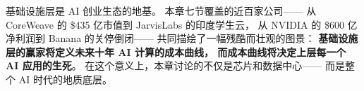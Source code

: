 基础设施层是 AI 创业生态的地基。
本章七节覆盖的近百家公司——
从 CoreWeave 的 \$435 亿市值到 JarvisLabs 的印度学生云，
从 NVIDIA 的 \$600 亿净利润到 Banana 的关停倒闭——
共同描绘了一幅残酷而壮观的图景：
\textbf{基础设施层的赢家将定义未来十年 AI 计算的成本曲线，
而成本曲线将决定上层每一个 AI 应用的生死}。
在这个意义上，本章讨论的不仅是芯片和数据中心——
而是整个 AI 时代的地质底层。
